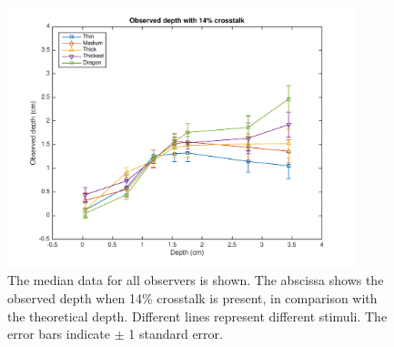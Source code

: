 \begin{figure}[H]
\centering
    \includegraphics[width=0.9\textwidth]{./Template_Figures/s_crosstalk_14}
\caption{The median data for all observers is shown. The abscissa shows the observed depth when 14\% crosstalk is present, in comparison with the theoretical depth. Different lines represent different stimuli. The error bars indicate $\pm$ 1 standard error.\label{fig:s_crosstalk_14}}
\end{figure}

